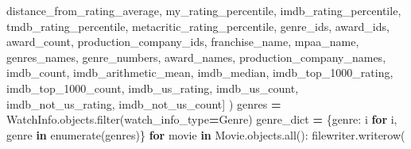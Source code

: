 \documentclass[
]{article}
\newenvironment{Shaded}{\begin{snugshade}}{\end{snugshade}}
\newcommand{\BuiltInTok}[1]{#1}
\newcommand{\ControlFlowTok}[1]{\textcolor[rgb]{0.13,0.29,0.53}{\textbf{#1}}}
\newcommand{\KeywordTok}[1]{\textcolor[rgb]{0.13,0.29,0.53}{\textbf{#1}}}
\newcommand{\NormalTok}[1]{#1}
\newcommand{\OperatorTok}[1]{\textcolor[rgb]{0.81,0.36,0.00}{\textbf{#1}}}
\newcommand{\StringTok}[1]{\textcolor[rgb]{0.31,0.60,0.02}{#1}}
\begin{document}
\begin{Shaded}
\begin{Highlighting}[]
                 \StringTok{\textquotesingle{}distance\_from\_rating\_average\textquotesingle{}}\NormalTok{, }\StringTok{\textquotesingle{}my\_rating\_percentile\textquotesingle{}}\NormalTok{, }\StringTok{\textquotesingle{}imdb\_rating\_percentile\textquotesingle{}}\NormalTok{,}
                 \StringTok{\textquotesingle{}tmdb\_rating\_percentile\textquotesingle{}}\NormalTok{, }\StringTok{\textquotesingle{}metacritic\_rating\_percentile\textquotesingle{}}\NormalTok{, }\StringTok{\textquotesingle{}genre\_ids\textquotesingle{}}\NormalTok{, }\StringTok{\textquotesingle{}award\_ids\textquotesingle{}}\NormalTok{, }\StringTok{\textquotesingle{}award\_count\textquotesingle{}}\NormalTok{,}
                 \StringTok{\textquotesingle{}production\_company\_ids\textquotesingle{}}\NormalTok{, }\StringTok{\textquotesingle{}franchise\_name\textquotesingle{}}\NormalTok{, }\StringTok{\textquotesingle{}mpaa\_name\textquotesingle{}}\NormalTok{, }\StringTok{\textquotesingle{}genres\_names\textquotesingle{}}\NormalTok{, }\StringTok{\textquotesingle{}genre\_numbers\textquotesingle{}}\NormalTok{,}
                 \StringTok{\textquotesingle{}award\_names\textquotesingle{}}\NormalTok{, }\StringTok{\textquotesingle{}production\_company\_names\textquotesingle{}}\NormalTok{, }\StringTok{\textquotesingle{}imdb\_count\textquotesingle{}}\NormalTok{, }\StringTok{\textquotesingle{}imdb\_arithmetic\_mean\textquotesingle{}}\NormalTok{, }\StringTok{\textquotesingle{}imdb\_median\textquotesingle{}}\NormalTok{,}
                 \StringTok{\textquotesingle{}imdb\_top\_1000\_rating\textquotesingle{}}\NormalTok{, }\StringTok{\textquotesingle{}imdb\_top\_1000\_count\textquotesingle{}}\NormalTok{, }\StringTok{\textquotesingle{}imdb\_us\_rating\textquotesingle{}}\NormalTok{, }\StringTok{\textquotesingle{}imdb\_us\_count\textquotesingle{}}\NormalTok{, }\StringTok{\textquotesingle{}imdb\_not\_us\_rating\textquotesingle{}}\NormalTok{,}
                 \StringTok{\textquotesingle{}imdb\_not\_us\_count\textquotesingle{}}\NormalTok{]}
\NormalTok{            )}
\NormalTok{            genres }\OperatorTok{=}\NormalTok{ WatchInfo.objects.}\BuiltInTok{filter}\NormalTok{(watch\_info\_type}\OperatorTok{=}\StringTok{\textquotesingle{}Genre\textquotesingle{}}\NormalTok{)}
\NormalTok{            genre\_dict }\OperatorTok{=}\NormalTok{ \{genre: i }\ControlFlowTok{for}\NormalTok{ i, genre }\KeywordTok{in} \BuiltInTok{enumerate}\NormalTok{(genres)\}}
            \ControlFlowTok{for}\NormalTok{ movie }\KeywordTok{in}\NormalTok{ Movie.objects.}\BuiltInTok{all}\NormalTok{():}
\NormalTok{                filewriter.writerow(}

\end{Highlighting}
\end{Shaded}
\end{document}
